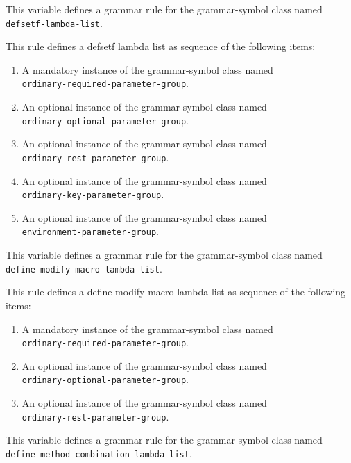 This variable defines a grammar rule for the grammar-symbol class
named \texttt{defsetf-lambda-list}.

This rule defines a defsetf lambda list as sequence of the following
items:

\begin{enumerate}
\item A mandatory instance of the grammar-symbol class named\\
  \texttt{ordinary-required-parameter-group}.
\item An optional instance of the grammar-symbol class named\\
  \texttt{ordinary-optional-parameter-group}.
\item An optional instance of the grammar-symbol class named\\
\texttt{ordinary-rest-parameter-group}.
\item An optional instance of the grammar-symbol class named\\
\texttt{ordinary-key-parameter-group}.
\item An optional instance of the grammar-symbol class named\\
\texttt{environment-parameter-group}.
\end{enumerate}


This variable defines a grammar rule for the grammar-symbol class
named \texttt{define-modify-macro-lambda-list}.

This rule defines a define-modify-macro lambda list as sequence of the
following items:

\begin{enumerate}
\item A mandatory instance of the grammar-symbol class named\\
  \texttt{ordinary-required-parameter-group}.
\item An optional instance of the grammar-symbol class named\\
  \texttt{ordinary-optional-parameter-group}.
\item An optional instance of the grammar-symbol class named\\
\texttt{ordinary-rest-parameter-group}.
\end{enumerate}


This variable defines a grammar rule for the grammar-symbol class
named \texttt{define-method-combination-lambda-list}.


